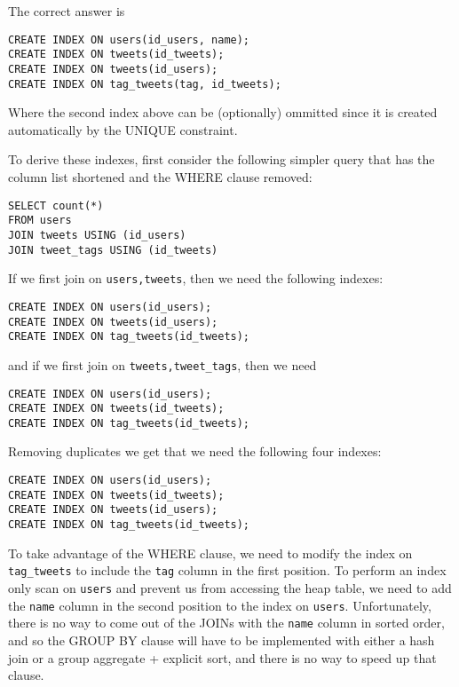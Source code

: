 \documentclass[12pt]{exam}
\theoremstyle{definition}
\begin{document}
\begin{questions}
\begin{solution}
\end{solution}


\newpage
{}

\begin{solution}
The correct answer is
\begin{lstlisting}
CREATE INDEX ON users(id_users, name);
CREATE INDEX ON tweets(id_tweets);
CREATE INDEX ON tweets(id_users);
CREATE INDEX ON tag_tweets(tag, id_tweets);
\end{lstlisting}
Where the second index above can be (optionally) ommitted since it is created automatically by the UNIQUE constraint.

To derive these indexes, first consider the following simpler query that has the column list shortened and the WHERE clause removed:
\begin{lstlisting}
SELECT count(*)
FROM users
JOIN tweets USING (id_users)
JOIN tweet_tags USING (id_tweets)
\end{lstlisting}
If we first join on \lstinline{users,tweets}, then we need the following indexes:
\begin{lstlisting}
CREATE INDEX ON users(id_users);
CREATE INDEX ON tweets(id_users);
CREATE INDEX ON tag_tweets(id_tweets);
\end{lstlisting}
and if we first join on \lstinline{tweets,tweet_tags}, then we need
\begin{lstlisting}
CREATE INDEX ON users(id_users);
CREATE INDEX ON tweets(id_tweets);
CREATE INDEX ON tag_tweets(id_tweets);
\end{lstlisting}
Removing duplicates we get that we need the following four indexes:
\begin{lstlisting}
CREATE INDEX ON users(id_users);
CREATE INDEX ON tweets(id_tweets);
CREATE INDEX ON tweets(id_users);
CREATE INDEX ON tag_tweets(id_tweets);
\end{lstlisting}
To take advantage of the WHERE clause, we need to modify the index on \lstinline{tag_tweets} to include the \lstinline{tag} column in the first position.
    To perform an index only scan on \lstinline{users} and prevent us from accessing the heap table, we need to add the \lstinline{name} column in the second position to the index on \lstinline{users}.
    Unfortunately, there is no way to come out of the JOINs with the \lstinline{name} column in sorted order,
    and so the GROUP BY clause will have to be implemented with either a hash join or a group aggregate + explicit sort,
    and there is no way to speed up that clause.


\end{solution}
\end{questions}
\end{document}
